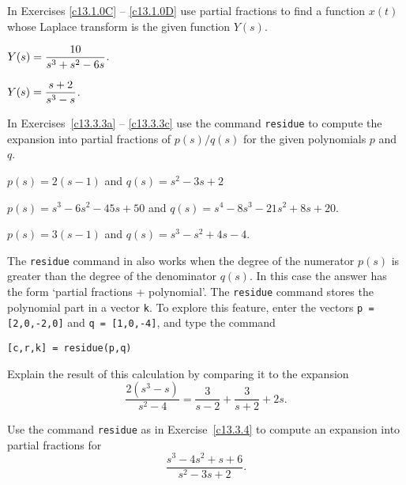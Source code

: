 \EXER

\TEXER

\noindent In Exercises \ref{c13.1.0C} -- \ref{c13.1.0D} use partial fractions
to find a function $x(t)$ whose Laplace transform is the given function
$Y(s)$.
\begin{exercise} \label{c13.1.0C}
$Y(s) = \displaystyle\frac{10}{s^3+s^2-6s}$.
\end{exercise}
\begin{exercise} \label{c13.1.0D}
$Y(s) = \displaystyle\frac{s+2}{s^3-s}$.
\end{exercise}



\CEXER



\noindent In Exercises~\ref{c13.3.3a} -- \ref{c13.3.3c} use the \Matlab 
command {\tt residue}
to compute the expansion into partial fractions of 
$p(s)/q(s)$ for the given polynomials $p$ and $q$.
\begin{exercise} \label{c13.3.3a}
$p(s)=2(s-1)$ and $q(s)=s^2-3s+2$
\end{exercise}
\begin{exercise} \label{c13.3.3b}
$p(s)=s^3-6s^2-45s+50$ and $q(s)=s^4-8s^3-21s^2+8s+20$.
\end{exercise}
\begin{exercise} \label{c13.3.3c}
$p(s)=3(s-1)$ and $q(s)=s^3-s^2+4s-4$.
\end{exercise}

\begin{exercise} \label{c13.3.4}
The {\tt residue} command in \Matlab also works when the degree of the
numerator $p(s)$ is greater than the degree of the denominator $q(s)$.
In this case the answer has the form `partial fractions + polynomial'.
The {\tt residue} command stores the polynomial part in a vector {\tt k}.
To explore this feature, enter the vectors {\tt p = [2,0,-2,0]} and
{\tt q = [1,0,-4]}, and type the command
\begin{verbatim}
[c,r,k] = residue(p,q)
\end{verbatim}
Explain the result of this calculation by comparing it to the expansion
\[
\frac{2(s^3-s)}{s^2-4} = \frac{3}{s-2} + \frac{3}{s+2} +2s.
\]
\end{exercise}

\begin{exercise} \label{c13.3.4b}
Use the command {\tt residue} as in Exercise~\ref{c13.3.4} to compute an 
expansion into partial fractions for
\[
\frac{s^3-4s^2+s+6}{s^2-3s+2}.
\]
\end{exercise}



